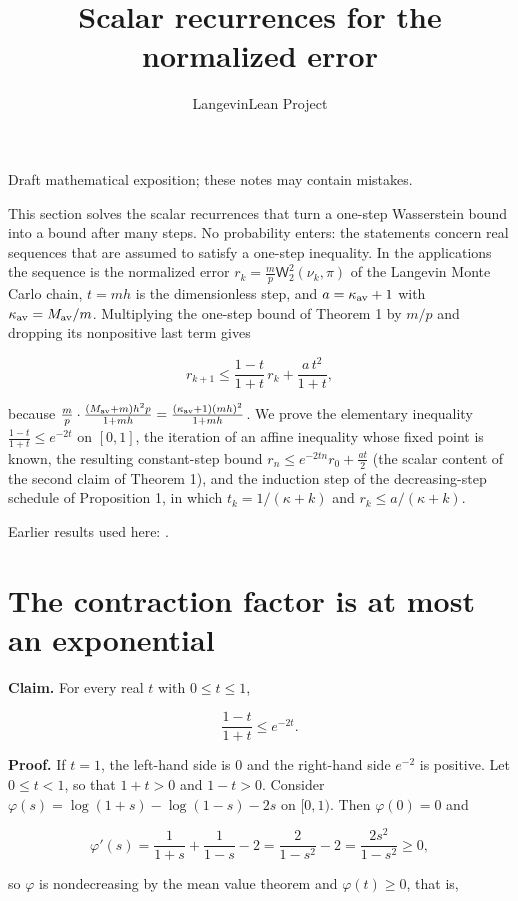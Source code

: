 \documentclass[11pt,a4paper]{article}
\title{\texorpdfstring{Scalar recurrences for the normalized error}{Scalar recurrences for the normalized error}}
\author{LangevinLean Project}
\date{}
\begin{document}
\maketitle
Draft mathematical exposition; these notes may contain mistakes.


This section solves the scalar recurrences that turn a one-step Wasserstein bound into a bound after many steps. No probability enters: the statements concern real sequences that are assumed to satisfy a one-step inequality. In the applications the sequence is the normalized error \(r_k=\frac mp\mathsf W_2^2(\nu_k,\pi)\) of the Langevin Monte Carlo chain, \(t=mh\) is the dimensionless step, and \(a=\kappa_{\rm av}+1\) with \(\kappa_{\rm av}=M_{\rm av}/m\). Multiplying the one-step bound of Theorem 1 by \(m/p\) and dropping its nonpositive last term gives


\[r_{k+1}\le\frac{1-t}{1+t}\,r_k+\frac{a\,t^2}{1+t},\]


because \(\frac mp\cdot\frac{(M_{\rm av}+m)h^2p}{1+mh}=\frac{(\kappa_{\rm av}+1)(mh)^2}{1+mh}\). We prove the elementary inequality \(\frac{1-t}{1+t}\le e^{-2t}\) on \([0,1]\), the iteration of an affine inequality whose fixed point is known, the resulting constant-step bound \(r_n\le e^{-2tn}r_0+\frac{at}2\) (the scalar content of the second claim of Theorem 1), and the induction step of the decreasing-step schedule of Proposition 1, in which \(t_k=1/(\kappa+k)\) and \(r_k\le a/(\kappa+k)\).



Earlier results used here: \cite[Section~3.15]{LangevinLean2026ULASC}.

\section{\texorpdfstring{The contraction factor is at most an exponential}{The contraction factor is at most an exponential}}


\textbf{Claim.} For every real \(t\) with \(0\le t\le1\),


\[\frac{1-t}{1+t}\le e^{-2t}.\]


\textbf{Proof.} If \(t=1\), the left-hand side is \(0\) and the right-hand side \(e^{-2}\) is positive. Let \(0\le t<1\), so that \(1+t>0\) and \(1-t>0\). Consider \(\varphi(s)=\log(1+s)-\log(1-s)-2s\) on \([0,1)\). Then \(\varphi(0)=0\) and


\[\varphi'(s)=\frac1{1+s}+\frac1{1-s}-2=\frac{2}{1-s^2}-2=\frac{2s^2}{1-s^2}\ge0,\]


so \(\varphi\) is nondecreasing by the mean value theorem and \(\varphi(t)\ge0\), that is,
\end{document}
